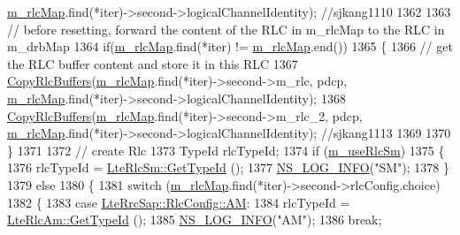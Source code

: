 \begin{DoxyCode}
      \hyperlink{classns3_1_1LteUeRrc_a64b3948cda818827b8774d7a2be7ea4f}{m\_rlcMap}.find(*iter)->second->logicalChannelIdentity); \textcolor{comment}{//sjkang1110}
1362 
1363           \textcolor{comment}{// before resetting, forward the content of the RLC in m\_rlcMap to the RLC in m\_drbMap}
1364           \textcolor{keywordflow}{if}(\hyperlink{classns3_1_1LteUeRrc_a64b3948cda818827b8774d7a2be7ea4f}{m\_rlcMap}.find(*iter) != \hyperlink{classns3_1_1LteUeRrc_a64b3948cda818827b8774d7a2be7ea4f}{m\_rlcMap}.end())
1365           \{
1366             \textcolor{comment}{// get the RLC buffer content and store it in this RLC}
1367             \hyperlink{classns3_1_1LteUeRrc_a16b7f4ca06cba845c7af6bb37670242e}{CopyRlcBuffers}(\hyperlink{classns3_1_1LteUeRrc_a64b3948cda818827b8774d7a2be7ea4f}{m\_rlcMap}.find(*iter)->second->m\_rlc, pdcp, 
      \hyperlink{classns3_1_1LteUeRrc_a64b3948cda818827b8774d7a2be7ea4f}{m\_rlcMap}.find(*iter)->second->logicalChannelIdentity);
1368             \hyperlink{classns3_1_1LteUeRrc_a16b7f4ca06cba845c7af6bb37670242e}{CopyRlcBuffers}(\hyperlink{classns3_1_1LteUeRrc_a64b3948cda818827b8774d7a2be7ea4f}{m\_rlcMap}.find(*iter)->second->m\_rlc\_2, pdcp, 
      \hyperlink{classns3_1_1LteUeRrc_a64b3948cda818827b8774d7a2be7ea4f}{m\_rlcMap}.find(*iter)->second->logicalChannelIdentity); \textcolor{comment}{//sjkang1113}
1369 
1370           \} 
1371 
1372           \textcolor{comment}{// create Rlc}
1373           TypeId rlcTypeId;
1374           \textcolor{keywordflow}{if} (\hyperlink{classns3_1_1LteUeRrc_a724b0f4009ef95b569c52afb344fd5ae}{m\_useRlcSm})
1375             \{
1376               rlcTypeId = \hyperlink{classns3_1_1LteRlcSm_a160bd39ce4e0d113dd5d93cc3a258045}{LteRlcSm::GetTypeId} ();
1377               \hyperlink{group__logging_gafbd73ee2cf9f26b319f49086d8e860fb}{NS\_LOG\_INFO}(\textcolor{stringliteral}{"SM"});
1378             \}
1379           \textcolor{keywordflow}{else}
1380             \{
1381               \textcolor{keywordflow}{switch} (\hyperlink{classns3_1_1LteUeRrc_a64b3948cda818827b8774d7a2be7ea4f}{m\_rlcMap}.find(*iter)->second->rlcConfig.choice)
1382                 \{
1383                 \textcolor{keywordflow}{case} \hyperlink{structns3_1_1LteRrcSap_1_1RlcConfig_ab6ab94ca4abaf717926f31db4dddc61baac722b7609a143367fc24a94f8e4f6c7}{LteRrcSap::RlcConfig::AM}: 
1384                   rlcTypeId = \hyperlink{classns3_1_1LteRlcAm_a28143176a465769583d9db0b4b36b91b}{LteRlcAm::GetTypeId} ();
1385                   \hyperlink{group__logging_gafbd73ee2cf9f26b319f49086d8e860fb}{NS\_LOG\_INFO}(\textcolor{stringliteral}{"AM"});
1386                   \textcolor{keywordflow}{break};

\end{DoxyCode}
